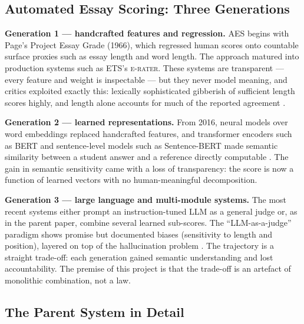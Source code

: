 \documentclass[11pt,a4paper]{article}
\begin{document}
\subsection{Automated Essay Scoring: Three Generations}

\textbf{Generation 1 --- handcrafted features and regression.} AES begins with
Page's Project Essay Grade (1966), which regressed human scores onto countable
surface proxies such as essay length and word length. The approach matured into
production systems such as ETS's \textsc{e-rater}. These systems are transparent
--- every feature and weight is inspectable --- but they never model meaning, and
critics exploited exactly this: lexically sophisticated gibberish of sufficient
length scores highly, and length alone accounts for much of the reported
agreement \cite{ke2019}.

\textbf{Generation 2 --- learned representations.} From 2016, neural models over
word embeddings replaced handcrafted features, and transformer encoders such as
BERT and sentence-level models such as Sentence-BERT made semantic similarity
between a student answer and a reference directly computable \cite{ke2019}. The
gain in semantic sensitivity came with a loss of transparency: the score is now a
function of learned vectors with no human-meaningful decomposition.

\textbf{Generation 3 --- large language and multi-module systems.} The most
recent systems either prompt an instruction-tuned LLM as a general judge or, as
in the parent paper, combine several learned sub-scores. The ``LLM-as-a-judge''
paradigm shows promise but documented biases (sensitivity to length and
position), layered on top of the hallucination problem
\cite{ji2023hallucination}. The trajectory is a straight trade-off: each
generation gained semantic understanding and lost accountability. The premise of
this project is that the trade-off is an artefact of monolithic combination, not
a law.

\subsection{The Parent System in Detail}
\end{document}
